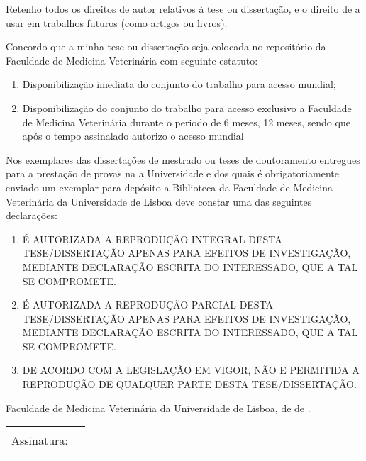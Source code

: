 Retenho todos os direitos de autor relativos à tese ou dissertação, e o direito de a usar em trabalhos futuros (como artigos ou livros).

Concordo que a minha tese ou dissertação seja colocada no repositório da Faculdade de Medicina Veterinária com seguinte estatuto:
\begin{enumerate}
  \item {} Disponibilização imediata do conjunto do trabalho para acesso mundial;
  \item {} Disponibilização do conjunto do trabalho para acesso exclusivo a Faculdade de Medicina Veterinária durante o periodo de  6 meses, 
 12 meses, sendo que após o tempo assinalado autorizo o acesso mundial%
\end{enumerate}

{\footnotesize Nos exemplares das dissertações de mestrado ou teses de doutoramento entregues para a prestação de provas na a
Universidade e dos quais é obrigatoriamente enviado um exemplar para depósito a Biblioteca da Faculdade de Medicina
Veterinária da Universidade de Lisboa deve constar uma das seguintes declarações:}
\begin{enumerate}
  \item [\checkbox{reproduction}{I}] 
        É AUTORIZADA A REPRODUÇÃO INTEGRAL DESTA TESE/DISSERTAÇÃO APENAS PARA EFEITOS DE INVESTIGAÇÃO, 
        MEDIANTE DECLARAÇÃO ESCRITA DO INTERESSADO, QUE A TAL SE COMPROMETE.
  \item [\checkbox{reproduction}{P}] 
        É AUTORIZADA A REPRODUÇÃO PARCIAL DESTA TESE/DISSERTAÇÃO APENAS PARA EFEITOS DE INVESTIGAÇÃO, 
        MEDIANTE DECLARAÇÃO ESCRITA DO INTERESSADO, QUE A TAL SE COMPROMETE.
  \item [\checkbox{reproduction}{N}] 
        DE ACORDO COM A LEGISLAÇÃO EM VIGOR, NÃO E PERMITIDA A REPRODUÇÃO DE QUALQUER PARTE DESTA 
        TESE/DISSERTAÇÃO.
\end{enumerate}
  
Faculdade de Medicina Veterinária da Universidade de Lisboa, 
 de
 de
.\par
\vspace*{2ex}
\begin{tabularx}{\linewidth}{@{}lX@{}}
Assinatura: & \rule{\linewidth}{0.75pt}
\end{tabularx}
\egroup

